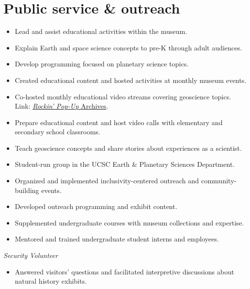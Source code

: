 \section{Public service \& outreach}

\begin{itemize}
\item Lead and assist educational activities within the museum.
\item Explain Earth and space science concepts to pre-K through adult audiences.
\item Develop programming focused on planetary science topics.
\end{itemize}

\begin{itemize}
	\item Created educational content and hosted activities at monthly museum events.
	\item Co-hosted monthly educational video streams covering geoscience topics. \\
	Link: \href{https://www.santacruzmuseum.org/category/rockin-pop-up/}{\emph{Rockin' Pop-Up} Archives}.
\end{itemize}

\begin{itemize}
	\item Prepare educational content and host video calls with elementary and secondary school classrooms.
	\item Teach geoscience concepts and share stories about experiences as a scientist.
\end{itemize}

\begin{itemize}
	\item Student-run group in the UCSC Earth \& Planetary Sciences Department.
	\item Organized and implemented inclusivity-centered outreach and community-building events.
\end{itemize}

\begin{itemize}
	\item Developed outreach programming and exhibit content.
	\item Supplemented undergraduate courses with museum collections and expertise.
	\item Mentored and trained undergraduate student interns and employees.
\end{itemize}


\textit{Security Volunteer}
\begin{itemize}
	\item Answered visitors' questions and facilitated interpretive discussions about natural history exhibits.
\end{itemize}